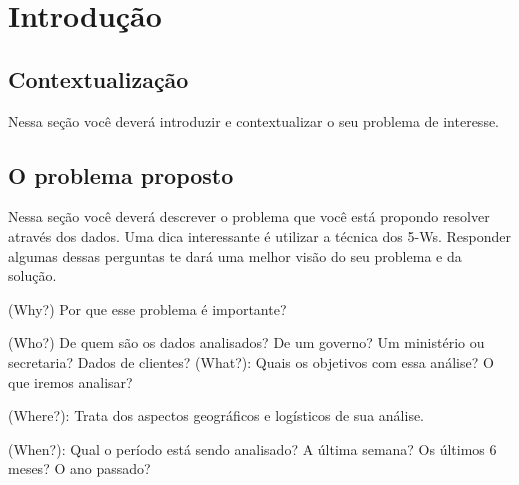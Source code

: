 \chapter{Introdução}


\section{Contextualização}
Nessa seção você deverá introduzir e contextualizar o seu problema de interesse. 

\section{O problema proposto}

Nessa seção você deverá descrever o problema que você está propondo resolver através dos dados. Uma dica interessante é utilizar a técnica dos 5-Ws. Responder algumas dessas perguntas te dará uma melhor visão do seu problema e da solução. 

(Why?) Por que esse problema é importante? 

(Who?) De quem são os dados analisados? De um governo? Um ministério ou secretaria? Dados de clientes? 
(What?): Quais os objetivos com essa análise? O que iremos analisar?  

(Where?): Trata dos aspectos geográficos e logísticos de sua análise. 

(When?): Qual o período está sendo analisado? A última semana? Os últimos 6 meses? O ano passado? 